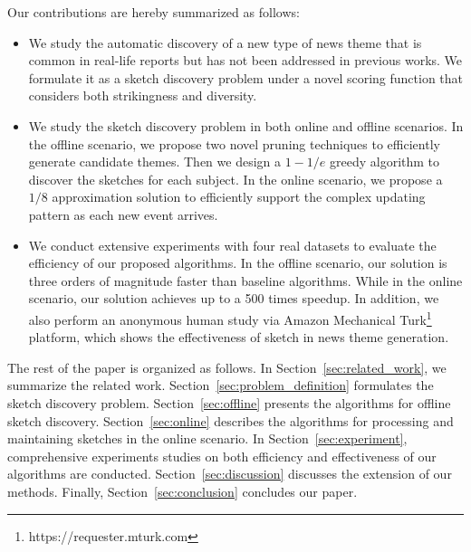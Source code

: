 Our contributions are hereby summarized as follows:
\begin{itemize}
\item We study the automatic discovery of a new type of news theme that is common in real-life reports but has not been addressed in previous works. We formulate it as a sketch discovery problem under a novel scoring function that considers both strikingness and diversity.
%

\item We study the sketch discovery problem in both online and offline scenarios. In the offline scenario, we propose two novel pruning techniques to efficiently generate candidate themes. Then we design a $1-1/e$ greedy algorithm to discover the sketches for each subject. In the online scenario, we propose a $1/8$ approximation solution to efficiently support the complex updating pattern as each new event arrives.

\item We conduct extensive experiments 
with four real datasets to evaluate the efficiency of our proposed algorithms. In the offline scenario,
our solution is three orders of magnitude faster than baseline algorithms. While in the online scenario,
our solution achieves up to a 500 times speedup. In addition, 
we also perform an anonymous human study via Amazon Mechanical Turk\footnote{https://requester.mturk.com} platform,
which shows the effectiveness of sketch in news theme generation.
\end{itemize}

The rest of the paper is organized as follows. In Section~\ref{sec:related_work},
we summarize the related work. Section~\ref{sec:problem_definition} formulates the sketch discovery problem. Section~\ref{sec:offline} presents the algorithms for offline sketch discovery. Section~\ref{sec:online} describes the algorithms for
processing and maintaining sketches in the online scenario.
In Section~\ref{sec:experiment}, comprehensive experiments studies on both efficiency and effectiveness of our algorithms are conducted.
Section~\ref{sec:discussion} discusses the extension of our methods. Finally,
Section~\ref{sec:conclusion} concludes our paper.
